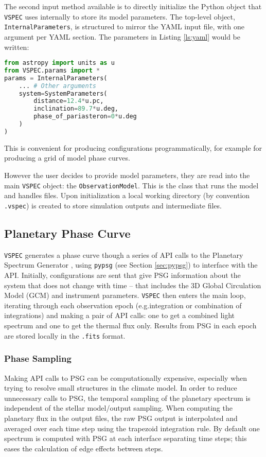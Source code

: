 \documentclass[twocolumn]{aastex631}
\newcommand{\vspec}[1]{\texttt{VSPEC}#1}
\begin{document}
The second input method available is to directly initialize the Python object that \vspec{} uses internally to store its model parameters.
The top-level object, \texttt{InternalParameters}, is structured to mirror the YAML input file, with one argument per YAML section. The
parameters in Listing \ref{ls:yaml} would be written:
\begin{lstlisting}[language=Python]
from astropy import units as u
from VSPEC.params import *
params = InternalParameters(
    ... # Other arguments
    system=SystemParameters(
        distance=12.4*u.pc,
        inclination=89.7*u.deg,
        phase_of_pariasteron=0*u.deg
    )
)
\end{lstlisting}
This is convenient for producing configurations programmatically, for example for producing a grid of model phase curves.

However the user decides to provide model parameters, they are read into the main \vspec{} object: the \texttt{ObservationModel}.
This is the class that runs the model and handles files. Upon initialization a local working directory
(by convention \texttt{.vspec}) is created to store simulation outputs and intermediate files.

\subsection{Planetary Phase Curve}
\label{subsec:phase-curve}
\vspec{} generates a phase curve though a series of API calls to the Planetary Spectrum Generator \citep[PSG][]{villanueva2018}, using
\texttt{pypsg} (see Section \ref{sec:pypsg}) to interface with the API. Initially, configurations are sent that give PSG information about
the system that does not change with time -- that includes the 3D Global Circulation Model (GCM) and instrument parameters. \vspec{} then enters
the main loop, iterating through each observation epoch (e.g.integration or combination of integrations) and making a pair of API calls: one to get a combined light spectrum and one to get the thermal flux only.
Results from PSG in each epoch are stored locally in the \texttt{.fits} format. 

\subsubsection{Phase Sampling}
Making API calls to PSG can be computationally expensive, especially when trying to resolve small structures in the climate model. In order to reduce unnecessary calls to PSG, the temporal sampling of the planetary spectrum is independent of the stellar model/output sampling. When computing the planetary flux in the output files, the raw PSG output is interpolated and averaged over each time step using the trapezoid integration rule. By default one spectrum is computed with PSG at each interface separating time steps; this eases the calculation of edge effects between steps.
\end{document}
